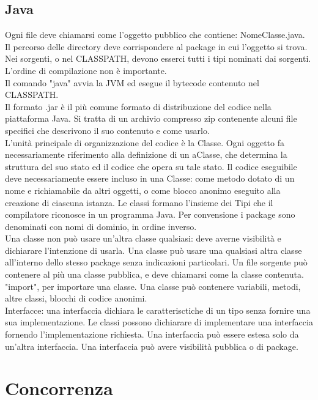 \documentclass{article}
\begin{document}
\subsection{Java}
Ogni file deve chiamarsi come l'oggetto pubblico che contiene:
NomeClasse.java.\\
Il percorso delle directory deve corrispondere al package in cui l'oggetto si
trova.\\
Nei sorgenti, o nel CLASSPATH, devono esserci tutti i tipi nominati dai
sorgenti.\\
L'ordine di compilazione non è importante.\\
Il comando "java" avvia la JVM ed esegue il bytecode contenuto nel CLASSPATH.\\
Il formato .jar è il più comune formato di distribuzione del codice nella
piattaforma Java. Si tratta di un archivio compresso zip contenente alcuni file
specifici che descrivono il suo contenuto e come usarlo.\\
L'unità principale di organizzazione del codice è la Classe. Ogni oggetto fa
necessariamente riferimento alla definizione di un aClasse, che determina la
struttura del suo stato ed il codice che opera su tale stato. Il codice
eseguibile deve necessariamente essere incluso in una Classe: come metodo
dotato di un nome e richiamabile da altri oggetti, o come blocco anonimo
eseguito alla creazione di ciascuna istanza. Le classi formano l'insieme dei
Tipi che il compilatore riconosce in un programma Java. Per convensione i
package sono denominati con nomi di dominio, in ordine inverso.\\
Una classe non può usare un'altra classe qualsiasi: deve averne visibilità e
dichiarare l'intenzione di usarla. Una classe può usare una qualsiasi altra
classe all'interno dello stesso package senza indicazioni particolari. Un file
sorgente può contenere al più una classe pubblica, e deve chiamarsi come la
classe contenuta. "import", per importare una classe.
Una classe può contenere variabili, metodi, altre classi, blocchi di codice
anonimi.\\

Interfacce: una interfaccia dichiara le caratterisctiche di un tipo senza
fornire una sua implementazione. Le classi possono dichiarare di implementare
una interfaccia fornendo l'implementazione richiesta.
Una interfaccia può essere estesa solo da un'altra interfaccia. Una interfaccia
può avere visibilità pubblica o di package.

\section{Concorrenza}
\end{document}
